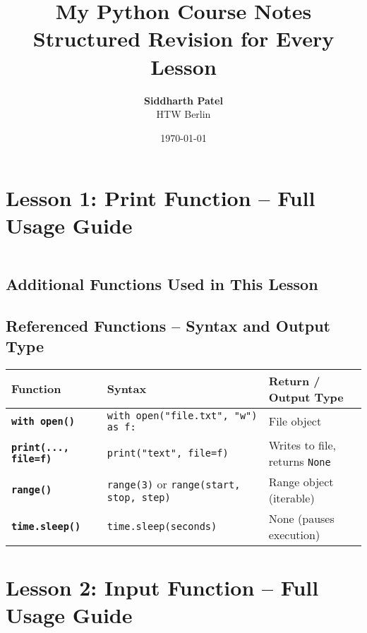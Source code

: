 \documentclass[a4paper,11pt]{article}
\title{\Huge \textbf{My Python Course Notes}\\[1ex]
	\Large Structured Revision for Every Lesson}
\author{\textbf{Siddharth Patel} \\ HTW Berlin}
\date{\today}
\begin{document}
	
	\maketitle
	\thispagestyle{empty}
	\newpage
	\tableofcontents
	\newpage
	
	\section{Lesson 1: Print Function – Full Usage Guide}
	\inputminted{python}{Python_Files/print_guid.py}
	
	\vspace{1em}
	\subsection*{Additional Functions Used in This Lesson}
	
\vspace{1em}
\subsection*{Referenced Functions – Syntax and Output Type}

\begin{tabular}{>{\bfseries}p{4cm} p{7.5cm} p{3cm}}
	\toprule
	Function & Syntax & Return / Output Type \\
	\midrule
	
	\texttt{with open()} & \texttt{with open("file.txt", "w") as f:} & File object \\
	\texttt{print(..., file=f)} & \texttt{print("text", file=f)} & Writes to file, returns \texttt{None} \\
	
	\texttt{range()} & \texttt{range(3)} or \texttt{range(start, stop, step)} & Range object (iterable) \\
	
	\texttt{time.sleep()} & \texttt{time.sleep(seconds)} & None (pauses execution) \\
	
	\bottomrule
\end{tabular}

	
	
	\section{Lesson 2: Input Function – Full Usage Guide}
	\inputminted{python}{Python_Files/input_guid.py}
	
\end{document}

